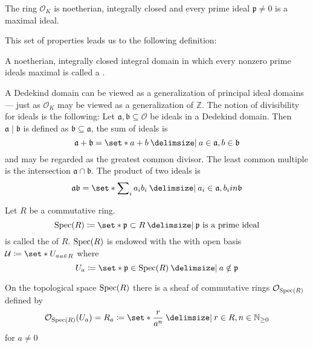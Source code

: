 \begin{theorem}[{name={\cite[Thm.~3.1]{neukirch}}}]
	The ring $\mathcal{O}_K$ is noetherian, integrally closed and every prime ideal $\mathfrak{p} \neq 0$ is a maximal ideal.
\end{theorem}

This set of properties leads us to the following definition:

\begin{definition}[{name=[Dedekind domain]}]
	A noetherian, integrally closed integral domain in which every nonzero prime ideals maximal is called a .
\end{definition}

A Dedekind domain can be viewed as a generalization of principal ideal domains --- just as $\mathcal{O}_K$ may be viewed as a generalization of $\mathbb{Z}$.
The notion of divisibility for ideals is the following: Let $\mathfrak{a}, \mathfrak{b} \subseteq \mathcal{O}$ be ideals in a Dedekind domain.
Then $\mathfrak{a} \mid \mathfrak{b}$ is defined as $\mathfrak{b} \subseteq \mathfrak{a}$, the sum of ideals is
\[
	\mathfrak{a} + \mathfrak{b} = \set*{a + b \given a \in \mathfrak{a}, b \in \mathfrak{b}}
\]
and may be regarded as the greatest common divisor.
The least common multiple is the intersection $\mathfrak{a} \cap \mathfrak{b}$.
The product of two ideals is
\[
	\mathfrak{a} \mathfrak{b} = \set*{\sum\nolimits_i a_i b_i \given a_i \in \mathfrak{a}, b_i in \mathfrak{b}}
\]




\begin{definition}[{name=[prime spectrum]}]
	Let $R$ be a commutative ring.
	\[
		\Spec(R) \coloneqq \set*{\mathfrak{p} \subset R \given \mathfrak{p} \text{ is a prime ideal} }
	\]
	is called the  of $R$.
	$\operatorname{Spec}(R)$ is endowed with the  with open basis $\mathcal{U} \coloneqq \set*{U_a}_{a \in R}$ where
	\[
		U_a \coloneqq \set*{\mathfrak{p} \in \Spec(R) \given a \notin \mathfrak{p}}
	\]
\end{definition}

On the topological space $\operatorname{Spec}(R)$ there is a sheaf of commutative rings $\mathcal{O}_{\operatorname{Spec}(R)}$ defined by
\[
	\mathcal{O}_{\Spec(R)}(U_a) = R_a \coloneqq \set*{\frac{r}{a^n} \given r \in R, n \in \mathbb{N}_{\ge 0}}
\]
for $a \neq 0$



\cleardoubleoddemptypage%
\setcounter{page}{1}
\appendix%
\printbibliography%
\printindex%
\todototoc%
\listoftodos[To-do's]

